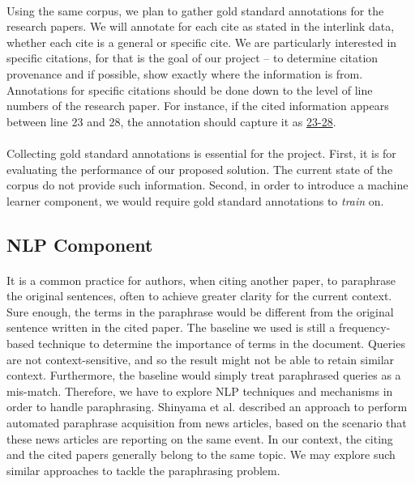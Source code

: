 \documentclass[12 pt]{article}
\begin{document}
\paragraph{}
Using the same corpus, we plan to gather gold standard annotations for the research papers. We will annotate for each cite as stated in the interlink data, whether each cite is a general or specific cite. We are particularly interested in specific citations, for that is the goal of our project -- to determine citation provenance and if possible, show exactly where the information is from. Annotations for specific citations should be done down to the level of line numbers of the research paper. For instance, if the cited information appears between line 23 and 28, the annotation should capture it as \url{23-28}.

\paragraph{}
Collecting gold standard annotations is essential for the project. First, it is for evaluating the performance of our proposed solution. The current state of the corpus do not provide such information. Second, in order to introduce a machine learner component, we would require gold standard annotations to \textit{train} on.

\subsection{NLP Component}
\paragraph{}
It is a common practice for authors, when citing another paper, to paraphrase the original sentences, often to achieve greater clarity for the current context. Sure enough, the terms in the paraphrase would be different from the original sentence written in the cited paper. The baseline we used is still a frequency-based technique to determine the importance of terms in the document. Queries are not context-sensitive, and so the result might not be able to retain similar context. Furthermore, the baseline would simply treat paraphrased queries as a mis-match. Therefore, we have to explore NLP techniques and mechanisms in order to handle paraphrasing. Shinyama et al.\cite{paraphrase2} described an approach to perform automated paraphrase acquisition from news articles, based on the scenario that these news articles are reporting on the same event. In our context, the citing and the cited papers generally belong to the same topic. We may explore such similar approaches to tackle the paraphrasing problem.

\singlespacing

\end{document}
